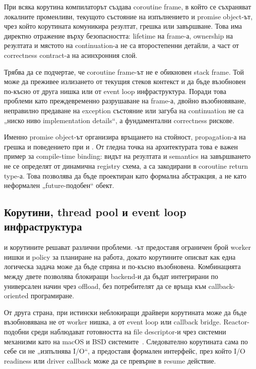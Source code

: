При всяка корутина компилаторът създава coroutine frame, в който се съхраняват локалните променливи, текущото състояние на изпълнението и promise object-ът, чрез който корутината комуникира резултат, грешка или завършване. Това има директно отражение върху безопасността: lifetime на frame-а, ownership на резултата и мястото на continuation-а не са второстепенни детайли, а част от correctness contract-а на асинхронния слой.

Трябва да се подчертае, че coroutine frame-ът не е обикновен stack frame. Той може да преживее излизането от текущия стеков контекст и да бъде възобновен по-късно от друга нишка или от event loop инфраструктура. Поради това проблеми като преждевременно разрушаване на frame-а, двойно възобновяване, неправилно предаване на exception състояние или загуба на continuation не са „ниско ниво implementation details“, а фундаментални correctness рискове.

Именно promise object-ът организира връщането на стойност, propagation-а на грешка и поведението при  и . От гледна точка на архитектурата това е важен пример за compile-time binding: видът на резултата и semantics на завършването не се определят от динамична registry схема, а са закодирани в coroutine return type-а. Това позволява  да бъде проектиран като формална абстракция, а не като неформален „future-подобен“ обект.

\subsection{Корутини, thread pool и event loop инфраструктура}

 и корутините решават различни проблеми. -ът предоставя ограничен брой worker нишки и policy за планиране на работа, докато корутините описват как една логическа задача може да бъде спряна и по-късно възобновена. Комбинацията между двете позволява блокиращи backend-и да бъдат интегрирани по универсален начин чрез offload, без потребителят да се връща към callback-oriented програмиране.

От друга страна, при истински неблокиращи драйвери корутината може да бъде възобновявана не от worker нишка, а от event loop или callback bridge. Reactor-подобни среди наблюдават готовността на file descriptor-и чрез системни механизми като  на macOS и BSD системите~\cite{kqueue_man}. Следователно корутината сама по себе си не „изпълнява I/O“, а предоставя формален интерфейс, през който I/O readiness или driver callback може да се превърне в resume действие.

